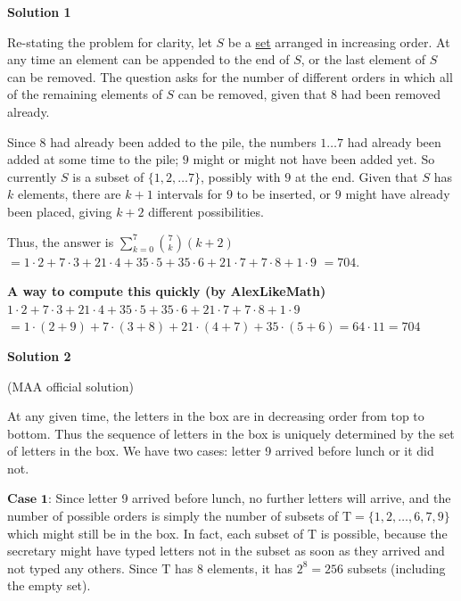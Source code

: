\begin{enumerate}
\textbf{Solution 1}

Re-stating the problem for clarity, let $S$ be a \href{https://artofproblemsolving.com/wiki/index.php?title=Set}{set} arranged in increasing order. At any time an element can be appended to the end of $S$, or the last element of $S$ can be removed. The question asks for the number of different orders in which all of the remaining elements of $S$ can be removed, given that $8$ had been removed already.  

 Since $8$ had already been added to the pile, the numbers $1 \ldots 7$ had already been added at some time to the pile; $9$ might or might not have been added yet. So currently $S$ is a subset of $\{1, 2, \ldots 7\}$, possibly with $9$ at the end. Given that $S$ has $k$ elements, there are $k+1$ intervals for $9$ to be inserted, or $9$ might have already been placed, giving $k+2$ different possibilities.

 Thus, the answer is $\sum_{k=0}^{7} {7 \choose k}(k+2)$ $= 1 \cdot 2 + 7 \cdot 3 + 21 \cdot 4 + 35 \cdot 5 + 35 \cdot 6 + 21 \cdot 7 + 7 \cdot 8 + 1 \cdot 9$ $= \boxed{704}$.

 \textbf{A way to compute this quickly (by AlexLikeMath)} $1 \cdot 2 + 7 \cdot 3 + 21 \cdot 4 + 35 \cdot 5 + 35 \cdot 6 + 21 \cdot 7 + 7 \cdot 8 + 1 \cdot 9$ $=1 \cdot (2+9) + 7 \cdot (3+8) + 21 \cdot (4+7) + 35 \cdot (5+6) = 64 \cdot 11 = \boxed{704}$




\textbf{Solution 2}

(MAA official solution)

 At any given time, the letters in the box are in decreasing order from top to bottom. Thus the sequence of letters in the box is uniquely determined by the set of letters in the box. We have two cases: letter 9 arrived before lunch or it did not.

 
$\textbf{Case 1:}$ Since letter 9 arrived before lunch, no further letters will arrive, and the number of possible orders is simply the number of subsets of $\mathrm{T}=\{1, 2, \ldots, 6, 7, 9\}$ which might still be in the box. In fact, each subset of $\mathrm{T}$ is possible, because the secretary might have typed letters not in the subset as soon as they arrived and not typed any others. Since $\mathrm{T}$ has 8 elements, it has $2^{8}=256$ subsets (including the empty set).


\end{enumerate}
